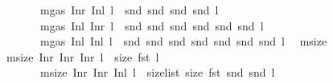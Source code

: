 \begin{isabellebody}
\ \ \ \ \ \ \ \ {\isacharbar}{\kern0pt}\ {\isachardoublequoteopen}mgas\ {\isacharparenleft}{\kern0pt}Inr\ {\isacharparenleft}{\kern0pt}Inl\ l{\isacharparenright}{\kern0pt}{\isacharparenright}{\kern0pt}\ {\isacharequal}{\kern0pt}\ snd\ {\isacharparenleft}{\kern0pt}snd\ {\isacharparenleft}{\kern0pt}snd\ {\isacharparenleft}{\kern0pt}snd\ l{\isacharparenright}{\kern0pt}{\isacharparenright}{\kern0pt}{\isacharparenright}{\kern0pt}{\isachardoublequoteclose}\ \isanewline
\ \ \ \ \ \ \ \ {\isacharbar}{\kern0pt}\ {\isachardoublequoteopen}mgas\ {\isacharparenleft}{\kern0pt}Inl\ {\isacharparenleft}{\kern0pt}Inr\ l{\isacharparenright}{\kern0pt}{\isacharparenright}{\kern0pt}\ {\isacharequal}{\kern0pt}\ snd\ {\isacharparenleft}{\kern0pt}snd\ {\isacharparenleft}{\kern0pt}snd\ {\isacharparenleft}{\kern0pt}snd\ {\isacharparenleft}{\kern0pt}snd\ {\isacharparenleft}{\kern0pt}snd\ l{\isacharparenright}{\kern0pt}{\isacharparenright}{\kern0pt}{\isacharparenright}{\kern0pt}{\isacharparenright}{\kern0pt}{\isacharparenright}{\kern0pt}{\isachardoublequoteclose}\ \ \isanewline
\ \ \ \ \ \ \ \ {\isacharbar}{\kern0pt}\ {\isachardoublequoteopen}mgas\ {\isacharparenleft}{\kern0pt}Inl\ {\isacharparenleft}{\kern0pt}Inl\ l{\isacharparenright}{\kern0pt}{\isacharparenright}{\kern0pt}\ {\isacharequal}{\kern0pt}\ snd\ {\isacharparenleft}{\kern0pt}snd\ {\isacharparenleft}{\kern0pt}snd\ {\isacharparenleft}{\kern0pt}snd\ {\isacharparenleft}{\kern0pt}snd\ {\isacharparenleft}{\kern0pt}snd\ {\isacharparenleft}{\kern0pt}snd\ l{\isacharparenright}{\kern0pt}{\isacharparenright}{\kern0pt}{\isacharparenright}{\kern0pt}{\isacharparenright}{\kern0pt}{\isacharparenright}{\kern0pt}{\isacharparenright}{\kern0pt}{\isachardoublequoteclose}\ \isanewline
\isanewline
{}\isamarkupfalse%
\ msize\isanewline
\ \ \ {\isachardoublequoteopen}msize\ {\isacharparenleft}{\kern0pt}Inr\ {\isacharparenleft}{\kern0pt}Inr\ {\isacharparenleft}{\kern0pt}Inr\ l{\isacharparenright}{\kern0pt}{\isacharparenright}{\kern0pt}{\isacharparenright}{\kern0pt}\ {\isacharequal}{\kern0pt}\ size\ {\isacharparenleft}{\kern0pt}fst\ l{\isacharparenright}{\kern0pt}{\isachardoublequoteclose}\isanewline
\ \ \ \ \ \ \ \ {\isacharbar}{\kern0pt}\ {\isachardoublequoteopen}msize\ {\isacharparenleft}{\kern0pt}Inr\ {\isacharparenleft}{\kern0pt}Inr\ {\isacharparenleft}{\kern0pt}Inl\ l{\isacharparenright}{\kern0pt}{\isacharparenright}{\kern0pt}{\isacharparenright}{\kern0pt}\ {\isacharequal}{\kern0pt}\ size{\isacharunderscore}{\kern0pt}list\ size\ {\isacharparenleft}{\kern0pt}fst\ {\isacharparenleft}{\kern0pt}snd\ {\isacharparenleft}{\kern0pt}snd\ l{\isacharparenright}{\kern0pt}{\isacharparenright}{\kern0pt}{\isacharparenright}{\kern0pt}{\isachardoublequoteclose}\isanewline

\end{isabellebody}
